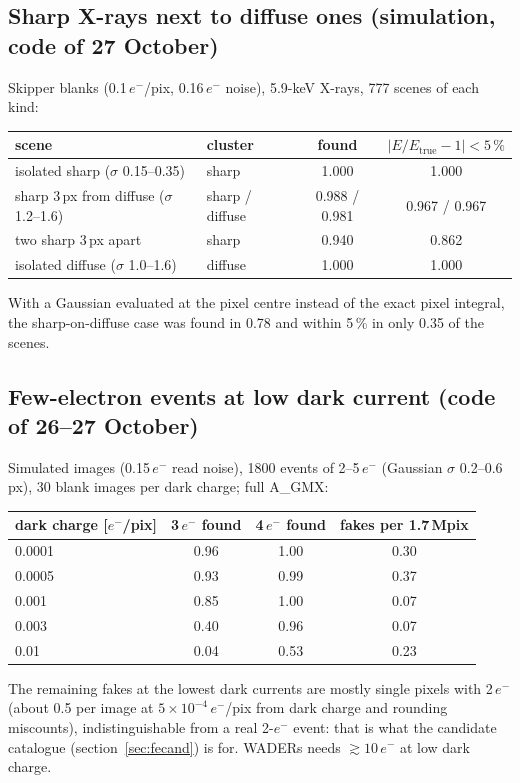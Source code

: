 \documentclass[11pt,a4paper]{article}
\newcommand{\el}{\ensuremath{e^-}}
\newcommand{\AGMX}{A\_GMX}
\begin{document}
\subsection{Sharp X-rays next to diffuse ones (simulation, code of 27 October)}
Skipper blanks (0.1\,\el/pix, 0.16\,\el{} noise), 5.9-keV X-rays, 777 scenes of each kind:
\begin{table}[H]\centering\footnotesize
\begin{tabular}{llcc}
\toprule
scene & cluster & found & $|E/E_\mathrm{true}-1|<5\,\%$ \\
\midrule
isolated sharp ($\sigma$ 0.15--0.35) & sharp & 1.000 & 1.000 \\
sharp 3\,px from diffuse ($\sigma$ 1.2--1.6) & sharp / diffuse & 0.988 / 0.981 & 0.967 / 0.967 \\
two sharp 3\,px apart & sharp & 0.940 & 0.862 \\
isolated diffuse ($\sigma$ 1.0--1.6) & diffuse & 1.000 & 1.000 \\
\bottomrule
\end{tabular}
\end{table}
\noindent With a Gaussian evaluated at the pixel centre instead of the exact pixel integral, the sharp-on-diffuse case was found
in 0.78 and within 5\,\% in only 0.35 of the scenes.

\subsection{Few-electron events at low dark current (code of 26--27 October)}\label{sec:lowe}
Simulated images (0.15\,\el{} read noise), 1800 events of 2--5\,\el{} (Gaussian $\sigma$ 0.2--0.6\,px), 30 blank images per dark
charge; full \AGMX:
\begin{table}[H]\centering\small
\begin{tabular}{lccc}
\toprule
dark charge [\el/pix] & 3\,\el{} found & 4\,\el{} found & fakes per 1.7\,Mpix \\
\midrule
0.0001 & 0.96 & 1.00 & 0.30 \\
0.0005 & 0.93 & 0.99 & 0.37 \\
0.001 & 0.85 & 1.00 & 0.07 \\
0.003 & 0.40 & 0.96 & 0.07 \\
0.01 & 0.04 & 0.53 & 0.23 \\
\bottomrule
\end{tabular}
\end{table}
\noindent The remaining fakes at the lowest dark currents are mostly single pixels with 2\,\el{} (about 0.5 per image at
$5\times10^{-4}$\,\el/pix from dark charge and rounding miscounts), indistinguishable from a real 2-\el{} event: that is what the
candidate catalogue (section~\ref{sec:fecand}) is for. WADERs needs $\gtrsim10$\,\el{} at low dark charge.
\end{document}

